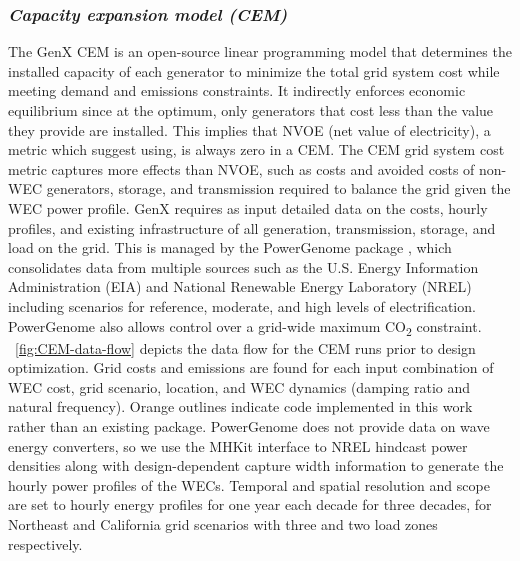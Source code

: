 \documentclass[10pt,twoside]{article}
\begin{document}
\subsubsection{\textit{Capacity expansion model (CEM)}}
The GenX CEM \cite{bonaldo_genxprojectgenxjl_2025} is an open-source linear programming model that determines the installed capacity of each generator to minimize the total grid system cost while meeting demand and emissions constraints.
It indirectly enforces economic equilibrium since at the optimum, only generators that cost less than the value they provide are installed.
This implies that NVOE (net value of electricity), a metric which \cite{mowers_evaluation_2021,mccabe_system_2023} suggest using, is always zero in a CEM.
The CEM grid system cost metric captures more effects than NVOE, such as costs and avoided costs of non-WEC generators, storage, and transmission required to balance the grid given the WEC power profile.
GenX requires as input detailed data on the costs, hourly profiles, and existing infrastructure of all generation, transmission, storage, and load on the grid.
This is managed by the PowerGenome package \cite{schivley_powergenomepowergenome_2025}, which consolidates data from multiple sources such as the U.S. Energy Information Administration (EIA) and National Renewable Energy Laboratory (NREL) including scenarios for reference, moderate, and high levels of electrification.
PowerGenome also allows control over a grid-wide maximum CO\textsubscript{2} constraint.
\figureautorefname~\ref{fig:CEM-data-flow} depicts the data flow for the CEM runs prior to design optimization.
Grid costs and emissions are found for each input combination of WEC cost, grid scenario, location, and WEC dynamics (damping ratio and natural frequency).
Orange outlines indicate code implemented in this work rather than an existing package.
PowerGenome does not provide data on wave energy converters, so we use the MHKit interface \cite{klise_mhkit_2020} to NREL hindcast power densities \cite{wu_development_2020,allahdadi_development_2019} along with design-dependent capture width information to generate the hourly power profiles of the WECs. 
Temporal and spatial resolution and scope are set to hourly energy profiles for one year each decade for three decades, for Northeast and California grid scenarios with three and two load zones respectively.
\end{document}
